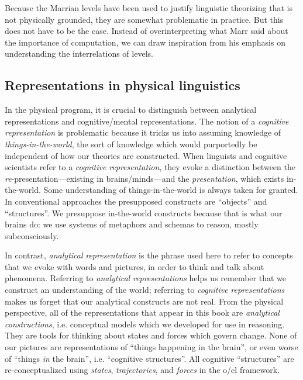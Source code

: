   Because the Marrian levels have been used to justify linguistic theorizing that is not physically grounded, they are somewhat problematic in practice. But this does not have to be the case. Instead of overinterpreting what Marr said about the importance of computation, we can draw inspiration from his emphasis on understanding the interrelations of levels. 

\subsection{Representations in physical linguistics}

In the physical program, it is crucial to distinguish between analytical representations and cognitive/mental representations. The notion of a \textit{cognitive} \textit{representation} is problematic because it tricks us into assuming knowledge of \textit{things-in-the-world}, the sort of knowledge which would purportedly be independent of how our theories are constructed. When linguists and cognitive scientists refer to a \textit{cognitive} \textit{representation}, they evoke a distinction between the \textit{re}{}-presentation—existing in brains/minds—and the \textit{presentation}, which exists in-the-world. Some understanding of things-in-the-world is always taken for granted. In conventional approaches the presupposed constructs are “objects” and “structures”. We presuppose in-the-world constructs because that is what our brains do: we use systems of metaphors and schemas to reason, mostly subconsciously. 

  In contrast, \textit{analytical} \textit{representation} is the phrase used here to refer to concepts that we evoke with words and pictures, in order to think and talk about phenomena. Referring to \textit{analytical} \textit{representations} helps us remember that we construct an understanding of the world; referring to \textit{cognitive} \textit{representations} makes us forget that our analytical constructs are not real. From the physical perspective, all of the representations that appear in this book are \textit{analytical} \textit{constructions}, i.e. conceptual models which we developed for use in reasoning. They are tools for thinking about states and forces which govern change. None of our pictures are representations of “things happening in the brain”, or even worse of “things \textit{in} the brain”, i.e. “cognitive structures”. All cognitive “structures” are re-conceptualized using \textit{states}, \textit{trajectories}, and \textit{forces} in the o/el framework. 

